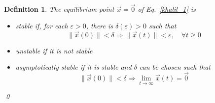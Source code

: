 \documentclass[11pt,a4paper,oneside]{book}
\numberwithin{equation}{section}
\theoremstyle{it}
\newtheorem{defn}{Definition}[chapter]
\theoremstyle{definition}
\begin{document}
\begin{defn}
	The equilibrium point $\vec{x}=\vec{0}$ of Eq.~\eqref{khalil_1} is
	\begin{itemize}
		\item stable if, for each $\varepsilon>0$, there is 
		$\delta(\varepsilon)>0$ such that
		\begin{equation*}
			\|\vec{x}(0)\|<\delta\Rightarrow\|\vec{x}(t)\|<\varepsilon,\quad\forall
			 t\ge0
		\end{equation*}
		\item unstable if it is not stable
		\item asymptotically stable if it is stable and $\delta$ can be chosen 
		such that
		\begin{equation*}
			\|\vec{x}(0)\|<\delta\Rightarrow 
			\lim\limits_{t\rightarrow\infty}\vec{x}(t)=\vec{0}
		\end{equation*}
	\end{itemize}
	\qed
\end{defn} 
\end{document}
